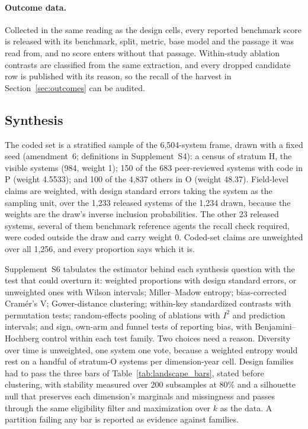 \paragraph{Outcome data.} Collected in the same reading as the design cells, every reported benchmark
score is released with its benchmark, split, metric, base model and the passage it was read from, and
no score enters without that passage.
Within-study ablation contrasts are classified from the same extraction, and every dropped candidate row
is published with its reason, so the recall of the harvest in Section~\ref{sec:outcomes} can be audited.

\subsection{Synthesis}\label{subsec:synthesis}

The coded set is a stratified sample of the 6,504-system frame, drawn with a fixed seed (amendment~6;
definitions in Supplement~S4): a census of stratum H, the visible systems (984, weight 1); 150 of the 683
peer-reviewed systems with code in P (weight 4.5533); and 100 of the 4,837 others in O (weight 48.37).
Field-level claims are weighted, with design standard errors taking the system as the sampling unit,
over the 1,233 released systems of the
1,234 drawn, because the weights are the draw's inverse inclusion probabilities. The other 23 released
systems, several of them benchmark reference agents the recall check required, were coded outside the
draw and carry weight 0. Coded-set claims are unweighted over all 1,256, and every proportion says which
it is.

Supplement~S6 tabulates the estimator behind each synthesis question with the test that could
overturn it: weighted proportions with design standard errors, or unweighted ones with Wilson
intervals; Miller--Madow entropy; bias-corrected Cram\'er's V; Gower-distance clustering;
within-key standardized contrasts with permutation tests; random-effects pooling of ablations with
$I^2$ \citep{higgins2002heterogeneity} and prediction intervals; and sign, own-arm and funnel tests of
reporting bias, with Benjamini--Hochberg control within each test family. Two choices need a reason.
Diversity over time is unweighted, one system one vote, because a weighted entropy would rest on a
handful of stratum-O systems per dimension-year cell. Design families had to pass the three bars of
Table~\ref{tab:landscape_bars}, stated before clustering, with stability measured over 200 subsamples at
80\% and a silhouette null that preserves each dimension's marginals and missingness and passes through
the same eligibility filter and maximization over $k$ as the data. A partition failing any bar is
reported as evidence against families.

